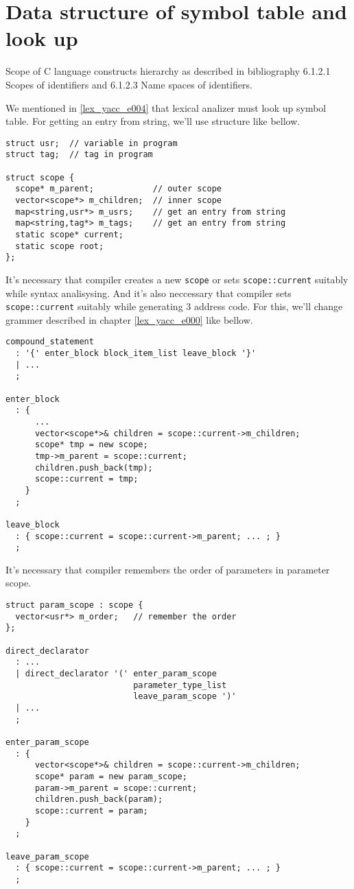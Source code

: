 \label{symtab_e002}

\section{Data structure of symbol table and look up}
Scope of C language constructs hierarchy as described in
bibliography \cite{ISO} 6.1.2.1 Scopes of identifiers and
6.1.2.3 Name spaces of identifiers.

We mentioned in \ref{lex_yacc_e004} that lexical analizer must look up
symbol table. For getting an entry from string, we'll use
structure like bellow.

\label{symtab_e000}
\begin{verbatim}
struct usr;  // variable in program
struct tag;  // tag in program

struct scope {
  scope* m_parent;            // outer scope
  vector<scope*> m_children;  // inner scope
  map<string,usr*> m_usrs;    // get an entry from string
  map<string,tag*> m_tags;    // get an entry from string
  static scope* current;
  static scope root;
};
\end{verbatim}

It's necessary that compiler creates a new {\tt{scope}} or sets
{\tt{scope::current}} suitably while syntax analisysing.
And it's also neccessary that compiler sets {\tt{scope::current}} suitably
while generating 3 address code.
For this, we'll change grammer described in chapter \ref{lex_yacc_e000}
like bellow.

\begin{verbatim}
compound_statement
  : '{' enter_block block_item_list leave_block '}'
  | ...
  ;

enter_block
  : {
      ...
      vector<scope*>& children = scope::current->m_children;
      scope* tmp = new scope;
      tmp->m_parent = scope::current;
      children.push_back(tmp);
      scope::current = tmp;
    }
  ;

leave_block
  : { scope::current = scope::current->m_parent; ... ; }
  ;
\end{verbatim}

It's necessary that compiler remembers the order of parameters in
parameter scope.
\begin{verbatim}
struct param_scope : scope {
  vector<usr*> m_order;   // remember the order
};

direct_declarator
  : ...
  | direct_declarator '(' enter_param_scope
                          parameter_type_list
                          leave_param_scope ')'
  | ...
  ;

enter_param_scope
  : {
      vector<scope*>& children = scope::current->m_children;
      scope* param = new param_scope;
      param->m_parent = scope::current;
      children.push_back(param);
      scope::current = param;
    }
  ;

leave_param_scope
  : { scope::current = scope::current->m_parent; ... ; }
  ;
\end{verbatim}

